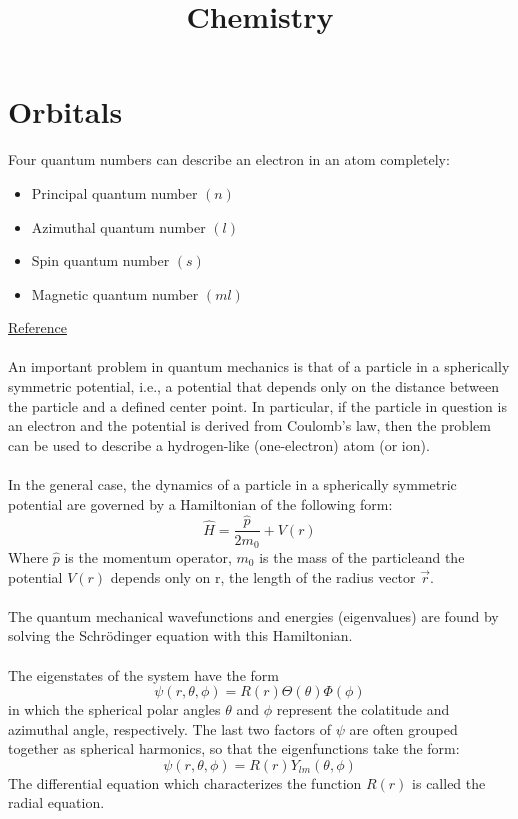 \documentclass[10pt]{extarticle}
\title{Chemistry}
\begin{document}
\maketitle
\noindent
\section{Orbitals}
Four quantum numbers can describe an electron in an atom completely:
\begin{itemize}
	\item Principal quantum number $(n)$
	\item Azimuthal quantum number $(l)$
	\item Spin quantum number $(s)$
	\item Magnetic quantum number $(ml)$
\end{itemize}
\href{https://en.wikipedia.org/wiki/Quantum_number}{Reference} \\ \\
\noindent
An important problem in quantum mechanics is that of a particle in a spherically symmetric potential, i.e., a potential that depends only on the distance between the particle and a defined center point. In particular, if the particle in question is an electron and the potential is derived from Coulomb's law, then the problem can be used to describe a hydrogen-like (one-electron) atom (or ion).
 \\ \\
In the general case, the dynamics of a particle in a spherically symmetric potential are governed by a Hamiltonian of the following form: 
$$\hat{H} = \frac{\hat{p}}{2m_0} + V(r)$$
Where $\hat{p}$ is the momentum operator, $m_0$ is the mass of the particleand the potential $V(r)$ depends only on  r, the length of the radius vector $\vec{r}$.  \\ \\
The quantum mechanical wavefunctions and energies (eigenvalues) are found by solving the Schrödinger equation with this Hamiltonian. \\ \\
The eigenstates of the system have the form
$$\psi (r,\theta ,\phi )=R(r)\Theta (\theta )\Phi (\phi )$$
in which the spherical polar angles $\theta$ and $\phi$ represent the colatitude and azimuthal angle, respectively. The last two factors of $\psi$ are often grouped together as spherical harmonics, so that the eigenfunctions take the form: 
$$\psi (r,\theta ,\phi )=R(r)Y_{lm}(\theta ,\phi )$$
The differential equation which characterizes the function $R(r)$ is called the radial equation. \\
\end{document}
